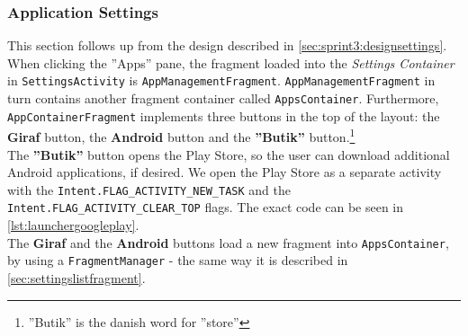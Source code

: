 \subsubsection{Application Settings}
This section follows up from the design described in \cref{sec:sprint3:designsettings}.
When clicking the ''Apps'' pane, the fragment loaded into the \textit{Settings Container} in \lstinline!SettingsActivity! is \lstinline!AppManagementFragment!.
\lstinline!AppManagementFragment! in turn contains another fragment container called \lstinline!AppsContainer!.
Furthermore, \lstinline!AppContainerFragment! implements three buttons in the top of the layout: the \textbf{Giraf} button, the \textbf{Android} button and the \textbf{''Butik''} button.\footnote{''Butik'' is the danish word for ''store''}\\


The \textbf{''Butik''} button opens the  Play Store, so the user can download additional Android applications, if desired. 
We open the Play Store as a separate activity with the \lstinline!Intent.FLAG_ACTIVITY_NEW_TASK! and the \lstinline!Intent.FLAG_ACTIVITY_CLEAR_TOP! flags.
The exact code can be seen in \cref{lst:launchergoogleplay}.\\

The \textbf{Giraf} and the \textbf{Android} buttons load a new fragment into \lstinline!AppsContainer!, by using a \lstinline!FragmentManager! - the same way it is described in \cref{sec:settingslistfragment}.\\

